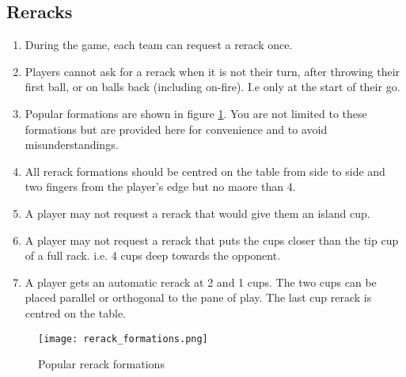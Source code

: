 	\subsection{Reracks}\label{ssec:Rerack}
		\begin{enumerate}[label=(\roman*)]
            \item \label{sssec:Rerack,number} During the game, each team can request a rerack once.
            \item \label{sssec:Rerack,notallowed} Players cannot ask for a rerack when it is not their turn, after throwing their first ball, or on balls back (including on-fire).
                I.e only at the start of their go.
            \item \label{sssec:Rerack,pop_forms} Popular formations are shown in figure \ref{fig:rerack_forms}.
                You are not limited to these formations but are provided here for convenience and to avoid misunderstandings. 
            \item \label{sssec:Rerack,centering} All rerack formations should be centred on the table from side to side and two fingers from the player's edge but no maore than 4.
            \item \label{sssec:Rerack,Island} A player may not request a rerack that would give them an island cup.
            \item \label{sssec:Rerack,4cupdeep} A player may not request a rerack that puts the cups closer than the tip cup of a full rack.
                i.e. 4 cups deep towards the opponent.
            \item \label{sssec:Rerack,autoreracks} A player gets an automatic rerack at 2 and 1 cups.
                The two cups can be placed parallel or orthogonal to the pane of play.
                The last cup rerack is centred on the table.
        \end{enumerate}
        \begin{figure}[H]
            \centering
            \texttt{[image: rerack\_formations.png]}
            \caption{Popular rerack formations}
            \label{fig:rerack_forms}
        \end{figure}
